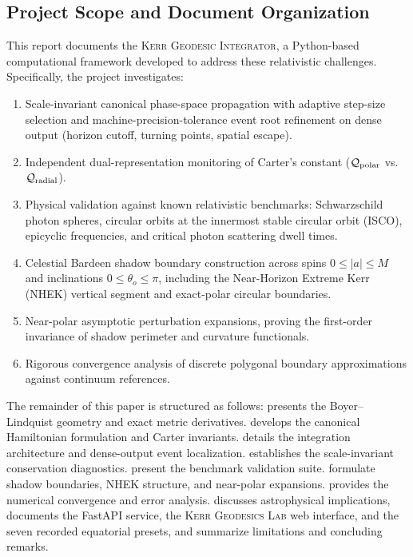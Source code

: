 \subsection{Project Scope and Document Organization}
This report documents the \textsc{Kerr Geodesic Integrator}, a Python-based computational framework developed to address these relativistic challenges. Specifically, the project investigates:
\begin{enumerate}[label=(\roman*)]
    \item Scale-invariant canonical phase-space propagation with adaptive step-size selection and machine-precision-tolerance event root refinement on dense output (horizon cutoff, turning points, spatial escape).
    \item Independent dual-representation monitoring of Carter's constant ($\mathcal{Q}_{\rm polar}$ vs. $\mathcal{Q}_{\rm radial}$).
    \item Physical validation against known relativistic benchmarks: Schwarzschild photon spheres, circular orbits at the innermost stable circular orbit (ISCO), epicyclic frequencies, and critical photon scattering dwell times.
    \item Celestial Bardeen shadow boundary construction across spins $0 \le |a| \le M$ and inclinations $0 \le \theta_o \le \pi$, including the Near-Horizon Extreme Kerr (NHEK) vertical segment and exact-polar circular boundaries.
    \item Near-polar asymptotic perturbation expansions, proving the first-order invariance of shadow perimeter and curvature functionals.
    \item Rigorous convergence analysis of discrete polygonal boundary approximations against continuum references.
\end{enumerate}

The remainder of this paper is structured as follows:  presents the Boyer--Lindquist geometry and exact metric derivatives.  develops the canonical Hamiltonian formulation and Carter invariants.  details the integration architecture and dense-output event localization.  establishes the scale-invariant conservation diagnostics.  present the benchmark validation suite.  formulate shadow boundaries, NHEK structure, and near-polar expansions.  provides the numerical convergence and error analysis.  discusses astrophysical implications,  documents the FastAPI service, the \textsc{Kerr Geodesics Lab} web interface, and the seven recorded equatorial presets, and  summarize limitations and concluding remarks.
